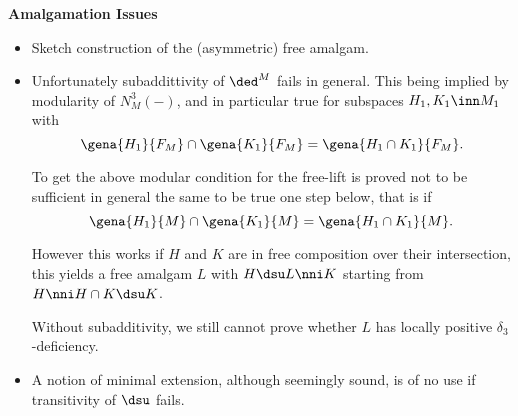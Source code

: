 \documentclass[a4paper,11pt,german,english]{report}
\begin{document}
\indent
{\bf Amalgamation Issues}
\begin{itemize}
\item[]Sketch construction of the (asymmetric) free amalgam.
\item[]Unfortunately subaddittivity of $\ded^{M}$ fails in general. This being implied
by modularity of $N^{3}_{M}(-)$, and in particular true for subspaces $H_{1},K_{1}\inn M_{1}$ with
$$\gena{H_{1}}{F_{M}}\cap\gena{K_{1}}{F_{M}}=\gena{H_{1}\cap K_{1}}{F_{M}}.$$

To get the above modular condition for the free-lift is proved not to be sufficient in general the same
to be true one step below, that is if
$$\gena{H_{1}}{{M}}\cap\gena{K_{1}}{{M}}=\gena{H_{1}\cap K_{1}}{{M}}.$$

However this works if $H$ and $K$ are in free composition over their intersection,
this yields a free amalgam $L$ with $H\dsu L\nni K$ starting from $H\nni H\cap K \dsu K$.

Without subadditivity, we still cannot prove whether $L$ has locally positive $\delta_{3}$-deficiency.



\item[]A notion of minimal extension, although seemingly sound, is of no use
if transitivity of $\dsu$ fails.
\end{itemize}
\end{document}
